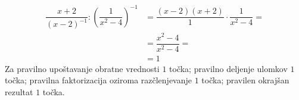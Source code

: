 \documentclass[addpoints]{exam}
\begin{document}
\begin{questions}
        \begin{solution}[7cm]
            \begin{align*}
                \dfrac{x+2}{(x-2)^{-1}}:\left(\dfrac{1}{x^2-4}\right)^{-1}&= \dfrac{(x-2)(x+2)}{1}\cdot\dfrac{1}{x^2-4}= \\
                                                                            &= \dfrac{x^2-4}{x^2-4}= \\
                                                                            &= 1
            \end{align*}
            Za pravilno upoštavanje obratne vrednosti $1$ točka; pravilno deljenje ulomkov $1$ točka; pravilna faktorizacija oziroma razčlenjevanje $1$ točka; pravilen okrajšan rezultat $1$ točka.
        \end{solution}











\end{questions}
\end{document}
